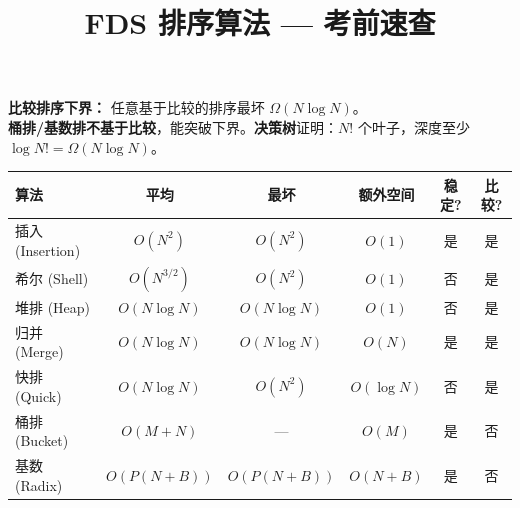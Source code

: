 \documentclass[10pt,a4paper]{article}
\title{\textbf{FDS 排序算法 — 考前速查}}
\author{}
\date{}
\begin{document}
\maketitle
\vspace{-10pt}

\begin{keybox}
\textbf{比较排序下界：} 任意基于比较的排序最坏 $\Omega(N\log N)$。\\
\textbf{桶排/基数排不基于比较}，能突破下界。\textbf{决策树}证明：$N!$ 个叶子，深度至少 $\log N! = \Omega(N\log N)$。
\end{keybox}

\begin{center}
\small
\begin{tabular}{|l|c|c|c|c|c|}
\hline
\textbf{算法} & \textbf{平均} & \textbf{最坏} & \textbf{额外空间} & \textbf{稳定?} & \textbf{比较?} \\
\hline
插入 (Insertion) & $O(N^2)$ & $O(N^2)$ & $O(1)$ & 是 & 是 \\
希尔 (Shell) & $O(N^{3/2})$ & $O(N^2)$ & $O(1)$ & 否 & 是 \\
堆排 (Heap) & $O(N\log N)$ & $O(N\log N)$ & $O(1)$ & 否 & 是 \\
归并 (Merge) & $O(N\log N)$ & $O(N\log N)$ & $O(N)$ & 是 & 是 \\
快排 (Quick) & $O(N\log N)$ & $O(N^2)$ & $O(\log N)$ & 否 & 是 \\
桶排 (Bucket) & $O(M+N)$ & — & $O(M)$ & 是 & 否 \\
基数 (Radix) & $O(P(N+B))$ & $O(P(N+B))$ & $O(N+B)$ & 是 & 否 \\
\hline
\end{tabular}
\end{center}
\end{document}
